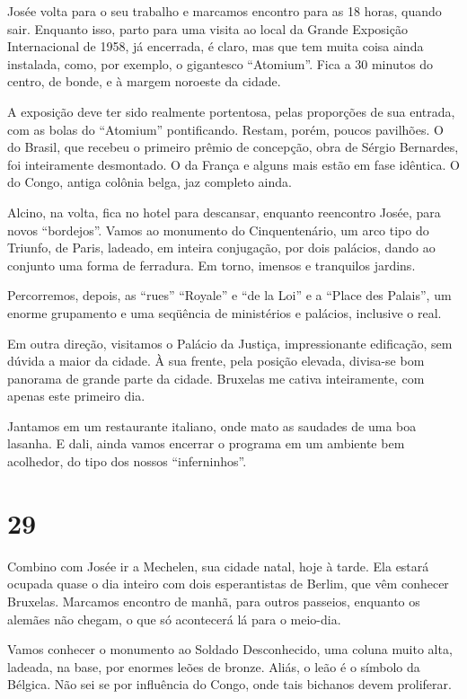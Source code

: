 Josée volta para o seu trabalho e marcamos encontro para as 18 horas, quando sair. Enquanto isso, parto para uma visita ao local da Grande Exposição Internacional de 1958, já encerrada, é claro, mas que tem muita coisa ainda instalada, como, por exemplo, o gigantesco ``Atomium''. Fica a 30 minutos do centro, de bonde, e à margem noroeste da cidade.

A exposição deve ter sido realmente portentosa, pelas proporções de sua entrada, com as bolas do ``Atomium'' pontificando. Restam, porém, poucos pavilhões. O do Brasil, que recebeu o primeiro prêmio de concepção, obra de Sérgio Bernardes, foi inteiramente desmontado. O da França e alguns mais estão em fase idêntica. O do Congo, antiga colônia belga, jaz completo ainda.

Alcino, na volta, fica no hotel para descansar, enquanto reencontro Josée, para novos ``bordejos''. Vamos ao monumento do Cinquentenário, um arco tipo do Triunfo, de Paris, ladeado, em inteira conjugação, por dois palácios, dando ao conjunto uma forma de ferradura. Em torno, imensos e tranquilos jardins.

Percorremos, depois, as ``rues'' ``Royale'' e ``de la Loi'' e a ``Place des Palais'', um enorme grupamento e uma seqüência de ministérios e palácios, inclusive o real.

Em outra direção, visitamos o Palácio da Justiça, impressionante edificação, sem dúvida a maior da cidade. À sua frente, pela posição elevada, divisa-se bom panorama de grande parte da cidade. Bruxelas me cativa inteiramente, com apenas este primeiro dia.

Jantamos em um restaurante italiano, onde mato as saudades de uma boa lasanha. E dali, ainda vamos encerrar o programa em um ambiente bem acolhedor, do tipo dos nossos ``inferninhos''.

\section*{29 \adfflatleafright {}}
Combino com Josée ir a Mechelen, sua cidade natal, hoje à tarde. Ela estará ocupada quase o dia inteiro com dois esperantistas de Berlim, que vêm conhecer Bruxelas. Marcamos encontro de manhã, para outros passeios, enquanto os alemães não chegam, o que só acontecerá lá para o meio-dia.

Vamos conhecer o monumento ao Soldado Desconhecido, uma coluna muito alta, ladeada, na base, por enormes leões de bronze. Aliás, o leão é o símbolo da Bélgica. Não sei se por influência do Congo, onde tais bichanos devem proliferar.

